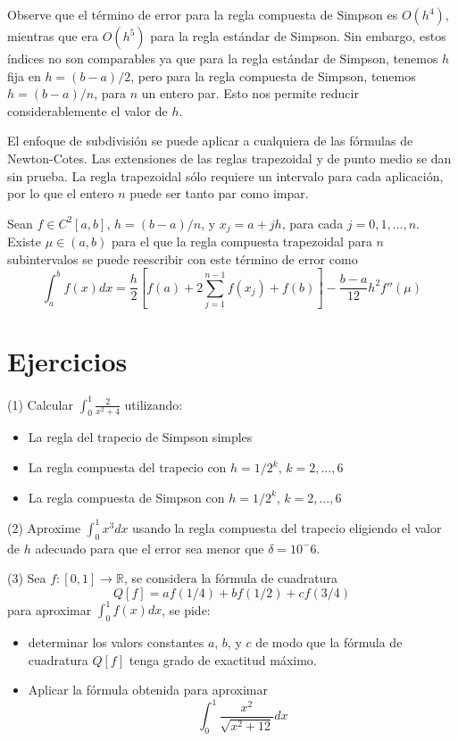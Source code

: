 Observe que el término de error para la regla compuesta de Simpson es $O(h^4)$, mientras que era $O(h^5)$ para la regla estándar de Simpson. Sin embargo, estos índices no son comparables ya que para la regla estándar de Simpson, tenemos $h$ fija en $h = (b - a)/2$, pero para la regla compuesta de Simpson, tenemos $h = (b - a)/n$, para $n$ un entero par. Esto nos permite reducir considerablemente el valor de $h$.

El enfoque de subdivisión se puede aplicar a cualquiera de las fórmulas de Newton-Cotes. Las extensiones de las reglas trapezoidal y de punto medio se dan sin prueba. La regla trapezoidal sólo requiere un intervalo para cada aplicación, por lo que el entero $n$ puede ser tanto par como impar.

\begin{theorem}
    Sean $f \in C^2[a, b]$, $h = (b- a)/n$, y $x_j = a + jh$, para cada $j = 0,1,...,n$. Existe $\mu \in (a, b)$ para el que la regla compuesta trapezoidal para $n$ subintervalos se puede reescribir con este término de error como 
    \[ \int_{a}^{b} f(x) dx = \frac{h}{2} \left[ f(a) + 2 \sum_{j = 1}^{n - 1}f(x_j) + f(b) \right] - \frac{b - a}{12} h^2 f''(\mu) \]
\end{theorem}

\section*{Ejercicios}
\noindent (1) Calcular $\int_{0}^{1} \frac{2}{x^2 + 4}$ utilizando:
\begin{itemize}
    \item La regla del trapecio de Simpson simples
    \item La regla compuesta del trapecio con $h = 1/2^k$, $k = 2,...,6$
    \item La regla compuesta de Simpson con $h = 1/2^k$, $k = 2,...,6$
\end{itemize}

\noindent (2) Aproxime $\int_{0}^{1} x^3 dx$ usando la regla compuesta del trapecio eligiendo el valor de $h$ adecuado para que el error sea menor que $\delta = 10^-6$.

\noindent (3) Sea $f : [0, 1] \rightarrow \mathbb{R}$, se considera la fórmula de cuadratura
\[ Q[f] = af(1/4) + bf(1/2) + cf(3/4) \]
para aproximar $\int_{0}^{1} f(x) dx$, se pide:
\begin{itemize}
    \item determinar los valors constantes $a$, $b$, y $c$ de modo que la fórmula de cuadratura $Q[f]$ tenga grado de exactitud máximo.
    \item Aplicar la fórmula obtenida para aproximar
    \[ \int_{0}^{1} \frac{x^2}{\sqrt{x^2 + 12}} dx \]
\end{itemize}

